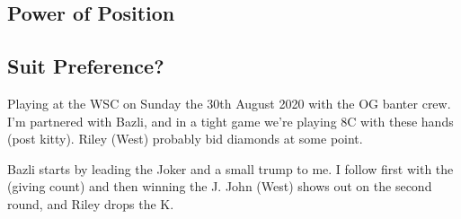 \documentclass[a4paper]{JoshCards}
\begin{document}
\subsection*{Power of Position}


\gamefont{\larger}
\leftupper{}%
{}{}
\rightupper{\contract:
8\Cl}{\declarer: \south}{}
\showAll*


\gamefont{\larger}
\leftupper{}%
{}{}
\rightupper{\contract:
8\Cl}{\declarer: \south}{}
\showAll*










\gamefont{\larger}
\leftupper{}%
{}{}
\rightupper{\contract:
8\Cl}{\declarer: \south}{}
\showAll*





\newpage
\subsection*{Suit Preference?}

Playing at the WSC on Sunday the 30th August 2020 with the OG banter crew. I'm partnered with Bazli, and in a tight game we're playing 8C with these hands (post kitty). Riley (West) probably bid diamonds at some point.

\gamefont{\larger}
\leftupper{}%
{}{}
\rightupper{}{}{}
\rightlower{}{}{}
\showAll*

Bazli starts by leading the Joker and a small trump to me. I follow first with the  (giving count) and then winning the \C J. John (West) shows out on the second round, and Riley drops the \C K. 
\end{document}
